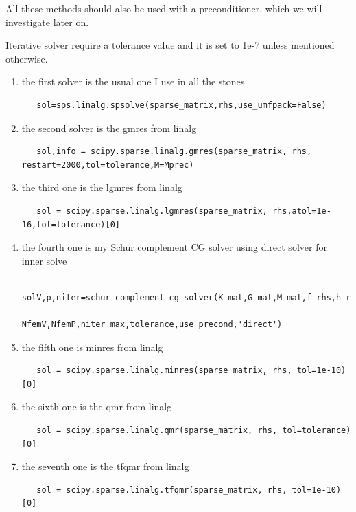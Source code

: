 All these methods should also be used with a preconditioner, which we will 
investigate later on.

Iterative solver require a tolerance value and it is set to 1e-7 unless mentioned
otherwise.

\newpage

\begin{enumerate}
\item the first solver is the usual one I use in all the stones
\begin{lstlisting}
   sol=sps.linalg.spsolve(sparse_matrix,rhs,use_umfpack=False)
\end{lstlisting}
\item the second solver is the gmres from linalg 
\begin{lstlisting}
   sol,info = scipy.sparse.linalg.gmres(sparse_matrix, rhs, restart=2000,tol=tolerance,M=Mprec)
\end{lstlisting}
\item the third one is the lgmres from linalg
\begin{lstlisting}
   sol = scipy.sparse.linalg.lgmres(sparse_matrix, rhs,atol=1e-16,tol=tolerance)[0]
\end{lstlisting}
\item the fourth one is my Schur complement CG solver using direct solver for inner solve
\begin{lstlisting}
   solV,p,niter=schur_complement_cg_solver(K_mat,G_mat,M_mat,f_rhs,h_rhs,\
                                          NfemV,NfemP,niter_max,tolerance,use_precond,'direct')
\end{lstlisting}
\item the fifth one is minres from linalg
\begin{lstlisting}
   sol = scipy.sparse.linalg.minres(sparse_matrix, rhs, tol=1e-10)[0]
\end{lstlisting}
\item the sixth one is the qmr from linalg
\begin{lstlisting}
   sol = scipy.sparse.linalg.qmr(sparse_matrix, rhs, tol=tolerance)[0]
\end{lstlisting}
\item the seventh one is the tfqmr from linalg
\begin{lstlisting}
   sol = scipy.sparse.linalg.tfqmr(sparse_matrix, rhs, tol=1e-10)[0]
\end{lstlisting}

\end{enumerate}
